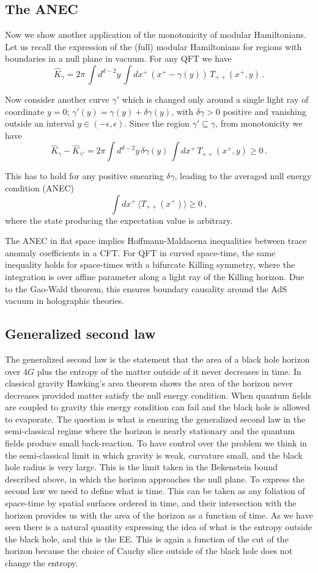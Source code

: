 \documentclass[11pt]{article}
\numberwithin{equation}{section}
\newcommand{\be}{\begin{equation}}
\newcommand{\ee}{\end{equation}}
\begin{document}
\subsection{The ANEC}
Now we show another application of the monotonicity of modular Hamiltonians. Let us recall the expression of the (full) modular Hamiltonians for regions with boundaries in a null plane in vacuum. For any QFT we have
\be
\hat{K}_\gamma=2\pi \, \int d^{d-2}y\, \int dx^+\, (x^+-\gamma(y)) \, T_{++}(x^+,y)\,. 
\ee

Now consider another curve $\gamma'$ which is changed only around a single light ray of coordinate $y=0$; $\gamma'(y)=\gamma(y)+\delta\gamma(y)$, with $\delta \gamma>0$ positive and vanishing outside an interval $y\in (-\epsilon,\epsilon)$. Since the region $\gamma'\subseteq \gamma$, from monotonicity we have
\be
\hat{K}_\gamma-\hat{K}_{\gamma'}=2 \pi\int d^{d-2}y\, \delta \gamma(y) \,\int dx^+\,  T_{++}(x^+,y)\ge 0\,.
\ee   

This has to hold for any positive smearing $\delta\gamma$, leading to the averaged null energy condition (ANEC)
\be
\int dx^+\,  \langle T_{++}(x^+)\rangle\ge 0\,,
\ee
where the state producing the expectation value is arbitrary. 

The ANEC in flat space implies Hoffmann-Maldacena inequalities between trace anomaly coefficients in a CFT. For QFT in curved space-time, the same inequality holds for space-times with a bifurcate Killing symmetry, where the integration is over affine parameter along a light ray of the Killing horizon. Due to the Gao-Wald theorem, this ensures boundary causality around the AdS vacuum in holographic theories.  

\subsection{Generalized second law}
The generalized second law is the statement that the area of a black hole horizon over $4G$ plus the entropy of the matter outside of it never decreases in time. In classical gravity  Hawking's area theorem shows the area of the horizon never decreases provided matter satisfy the null energy condition. When quantum fields are coupled to gravity this energy condition can fail and the black hole is allowed to evaporate. The question is what is ensuring the generalized second law in the semi-classical regime where the horizon is nearly stationary and the quantum fields produce small back-reaction.      
To have control over the problem we think in the semi-classical limit in which gravity is weak, curvature small, and the black hole radius is very large. This is the limit taken in the Bekenstein bound described above, in which the horizon approaches the null plane. To express the second law we need to define what is time. This can be taken as any foliation of space-time by spatial surfaces ordered in time, and their intersection with the horizon provides us with the area of the horizon as a function of time.  
As we have seen there is a natural quantity expressing the idea of what is the entropy outside the black hole, and this is the EE. This is again a function of the cut of the horizon because the choice of Cauchy slice outside of the black hole does not change the entropy.      
\end{document}
